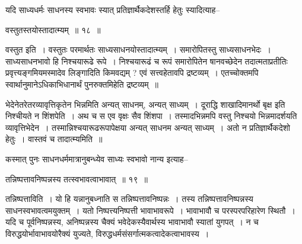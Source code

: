 \documentclass[article,12pt,a4paper]{memoir}
\begin{document}
	यदि साध्यधर्मः साधनस्य स्वभावः स्यात् प्रतिज्ञार्थैकदेशस्तर्हि हेतुः स्यादित्याह--  
	  
	वस्तुतस्तयोस्तादात्म्यम् ॥ १८ ॥ 
	  
	वस्तुत इति । वस्तुतः परमार्थतः साध्यसाधनयोस्तादात्म्यम् । समारोपितस्तु साध्यसाधनभेदः । साध्यसाधनभावो हि निश्चयारूढे रूपे । निश्चयारूढं च रूपं समारोपितेन षानवच्छेदेन तदात्मताप्रतीतिः प्रवृत्त्यङ्गमियमस्मादेव लिङ्गादिति किमवद्यम् ? एवं सत्त्वहेतावपि द्रष्टव्यम् । एतच्चोक्तमपि स्वार्थानुमानेऽधिकाभिधानार्थं पुनरुक्तमिहेति द्रष्टव्यम् ॥
	\pend
	  \bigskip
	  \begingroup
	

	  \pstart भेदेनेतरेतरव्यावृत्तिकृतेन भिन्नमिति अन्यत् साधनम्, अन्यत् साध्यम् । दूराद्धि शाखादिमानर्थो बृक्ष इति निश्चीयते न शिंशपेति । अथ च स एव वृक्षः सैव शिंशपा । तस्मादभिन्नमपि वस्तु निश्चयो भिन्नमादर्शयति व्यावृत्तिभेदेन । तस्मान्निश्चयारूढरूपापेक्षया अन्यत् साधनम अन्यत् साध्यम् । अतो न प्रतिज्ञार्थैकदेशो हेतुः । वास्तवं च तादात्म्यमिति ॥
	\pend
        

	  \pstart कस्मात् पुनः साधनधर्ममात्रानुबन्ध्येव साध्यः स्वभावो नान्य इत्याह--
	\pend
        
	  \bigskip
	  \begingroup
	

	  \pstart तन्निष्पत्तावनिष्पन्नस्य तत्स्वभावत्वाभावात् ॥ १९ ॥
	\pend
      
	  \endgroup
	 

	  \pstart तन्निष्पत्ताविति । यो हि यन्नानुबध्नाति स तन्निष्पत्तावनिष्पन्नः । तस्य तन्निष्पत्तावनिष्पन्नस्य साधनस्वभावत्वमयुक्तम् । यतो निष्पत्त्यनिष्पत्ती भावाभावरूपे । भावाभावौ च परस्परपरिहारेण स्थितौ । यदि च पूर्वनिष्पन्नस्य, अनिष्पन्नस्य चैक्यं भवेदेकस्यैवार्थस्य भावाभावौ स्यातां युगपत् । न च विरुद्धयोर्भावाभावयोरैक्यं युज्यते, विरुद्धधर्मसंसर्गात्मकत्वादेकत्वाभावस्य ।
	\pend
        
\end{document}

